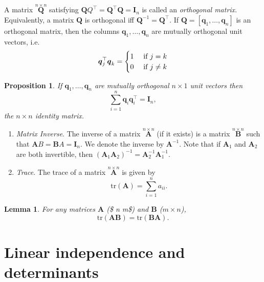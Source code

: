 \documentclass[]{book}
\newtheorem{lemma}{Lemma}[chapter]
\newtheorem{proposition}{Proposition}[chapter]
\theoremstyle{definition}
\theoremstyle{definition}
\theoremstyle{definition}
\theoremstyle{remark}
\begin{document}
\begin{enumerate}
  A matrix \(\stackrel{n\times n}{\mathbf Q}\) satisfying \({\mathbf QQ}^\top = {\mathbf Q}^\top {\mathbf Q}={\mathbf I}_n\) is called an
  \emph{orthogonal matrix}. Equivalently, a matrix \(\mathbf Q\) is orthogonal iff \({\mathbf Q}^{-1}={\mathbf Q}^\top\).\newline 
  If \({\mathbf Q}=[\boldsymbol q_1,\ldots, \boldsymbol q_n]\) is an orthogonal matrix, then the columns \(\boldsymbol q_1, \ldots, \boldsymbol q_n\) are mutually orthogonal unit vectors, i.e.
  \[
  \boldsymbol q_j^\top \boldsymbol q_k=\begin{cases} 1 &\hbox{ if }  j=k\\
  0 &\hbox{ if }   j \neq k \\
  \end{cases}
  \]
\end{enumerate}

\begin{proposition}
\protect\hypertarget{prp:two1}{}{\label{prp:two1} }If \(\boldsymbol q_1, \ldots , \boldsymbol q_n\) are mutually orthogonal \(n \times 1\) unit vectors then
\[
\sum_{i=1}^n \boldsymbol q_i \boldsymbol q_i^\top = {\mathbf I}_n,
\]
the \(n \times n\) identity matrix.
\end{proposition}

\begin{enumerate}
\def\labelenumi{\arabic{enumi}.}
\setcounter{enumi}{4}
\item
  \emph{Matrix Inverse}. The inverse of a matrix \(\stackrel{n\times n}{\mathbf A}\) (if it exists) is a
  matrix \(\stackrel{n\times n}{\mathbf B}\) such that \({\mathbf AB}={\mathbf BA}={\mathbf I}_n.\) We denote
  the inverse by \({\mathbf A}^{-1}\). Note that if \({\mathbf A}_1\) and \({\mathbf A}_2\) are both invertible,
  then \(({\mathbf A}_1 {\mathbf A}_2)^{-1}={\mathbf A}_2^{-1}{\mathbf A}_1^{-1}\).
\item
  \emph{Trace}. The trace of a matrix \(\stackrel{n\times n}{\mathbf A}\) is given by
  \[ \text{tr}({\mathbf A})=\sum _{i=1}^n a_{ii}.\]
\end{enumerate}

\begin{lemma}
\protect\hypertarget{lem:unnamed-chunk-1}{}{\label{lem:unnamed-chunk-1} }For any matrices \(\boldsymbol A\) (\$ n \times m\$) and \(\boldsymbol B\) (\(m \times n\)),
\[
\text{tr}(\boldsymbol A\boldsymbol B) = \text{tr}(\boldsymbol B\boldsymbol A).
\]
\end{lemma}

\hypertarget{linear-independence-and-determinants}{%
\section{Linear independence and determinants}\label{linear-independence-and-determinants}}
\end{document}
